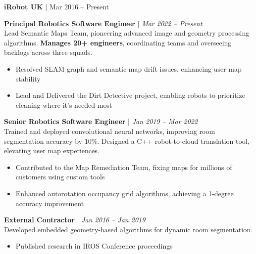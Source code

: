 \documentclass[11pt,a4paper]{article}
\newcommand{\role}[2]{\textbf{#1} | \textit{#2}}
\begin{document}
\begin{minipage}[c]{0.6\linewidth}




\noindent \textbf{iRobot UK} | Mar 2016 -- Present

\vspace{0.1cm}

\noindent \role{Principal Robotics Software Engineer}{Mar 2022 -- Present}\\
Lead Semantic Maps Team, pioneering advanced image and geometry processing algorithms. \textbf{Manages 20+ engineers}, coordinating teams and overseeing backlogs across three squads.
\begin{itemize}[leftmargin=*,nosep]
\item Resolved SLAM graph and semantic map drift issues, enhancing user map stability
\item Lead and Delivered the Dirt Detective project, enabling robots to prioritize cleaning where it's needed most
\end{itemize}

\vspace{0.1cm}

\noindent \role{Senior Robotics Software Engineer}{Jan 2019 -- Mar 2022}\\
Trained and deployed convolutional neural networks, improving room segmentation accuracy by 10\%. Designed a C++ robot-to-cloud translation tool, elevating user map experiences.
\begin{itemize}[leftmargin=*,nosep]
\item Contributed to the Map Remediation Team, fixing maps for millions of customers using custom tools
\item Enhanced autorotation occupancy grid algorithms, achieving a 1-degree accuracy improvement
\end{itemize}

\vspace{0.1cm}

\noindent \role{External Contractor}{Jan 2016 -- Jan 2019}\\
Developed embedded geometry-based algorithms for dynamic room segmentation.
\begin{itemize}[leftmargin=*,nosep]
\item Published research in IROS Conference proceedings
\end{itemize}

\noindent \hrulefill


\end{minipage}
\end{document}
